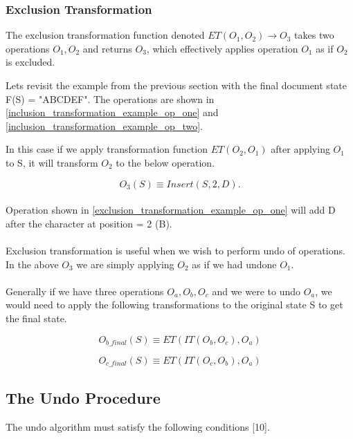 \documentclass[9pt, titlepage]{article}
\begin{document}
  \subsubsection{Exclusion Transformation}
  The exclusion transformation function denoted \(ET(O_{1}, O_{2}) \rightarrow O_{3}\) takes two operations
  \(O_{1}, O_{2}\) and returns \(O_{3}\), which effectively applies operation \(O_{1}\) as if \(O_{2}\) is excluded.

  Lets revisit the example from the previous section with the final  document state F(S) = "ABCDEF".
  The operations are shown in \ref{inclusion_transformation_example_op_one} and \ref{inclusion_transformation_example_op_two}.

  In this case if we apply transformation function \(ET(O_{2}, O_{1})\) after applying \(O_{1}\) to S,
  it will transform \(O_{2}\) to the below operation.

  \begin{equation} \label{exclusion_transformation_example_op_one}
    O_{3}(S) \equiv Insert(S, 2, D).
  \end{equation}\\
  Operation shown in \ref{exclusion_transformation_example_op_one} will add D after the character at position = 2 (B).
  \\ \\
  Exclusion transformation is useful when we wish to perform undo of operations.
  In the above \(O_{3}\) we are simply applying \(O_{2}\) as if we had undone \(O_{1}\).
  \\ \\
  Generally if we have three operations \(O_{a}, O_{b}, O_{c}\)
  and we were to undo \(O_{a}\), we would need to apply the following transformations to the original state S to get the final state.

  \begin{equation} \label{exclusion_transformation_example_op_two}
    O_{b\_final}(S) \equiv ET(IT(O_{b}, O_{c}), O_{a})
  \end{equation}

  \begin{equation} \label{exclusion_transformation_example_op_three}
    O_{c\_final}(S) \equiv ET(IT(O_{c}, O_{b}), O_{a})
  \end{equation}

  \subsection{The Undo Procedure}
  The undo algorithm must satisfy the following conditions [10].
\end{document}
